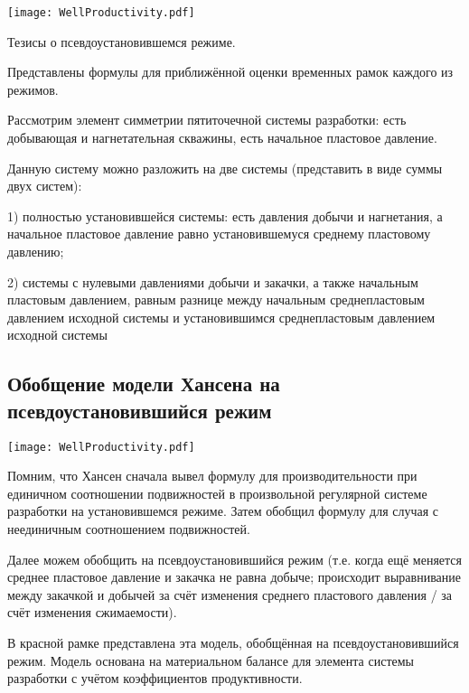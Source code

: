 \documentclass[main.tex]{subfiles}
\begin{document}
\texttt{[image: WellProductivity.pdf]}

Тезисы о псевдоустановившемся режиме.

Представлены формулы для приближённой оценки временных рамок каждого из режимов.


Рассмотрим элемент симметрии пятиточечной системы разработки: есть добывающая и нагнетательная скважины, есть начальное пластовое давление.

Данную систему можно разложить на две системы (представить в виде суммы двух систем):

1) полностью установившейся системы: есть давления добычи и нагнетания, а начальное пластовое давление равно установившемуся среднему пластовому давлению;

2) системы с нулевыми давлениями добычи и закачки, а также начальным пластовым давлением, равным разнице между начальным среднепластовым давлением исходной системы и установившимся среднепластовым давлением исходной системы

\subsection{Обобщение модели Хансена на псевдоустановившийся режим}

\texttt{[image: WellProductivity.pdf]}


Помним, что Хансен сначала вывел формулу для производительности при единичном соотношении подвижностей в произвольной регулярной системе разработки на установившемся режиме. Затем обобщил формулу для случая с неединичным соотношением подвижностей.

Далее можем обобщить на псевдоустановившийся режим (т.е. когда ещё меняется среднее пластовое давление и закачка не равна добыче; происходит выравнивание между закачкой и добычей за счёт изменения среднего пластового давления / за счёт изменения сжимаемости).

В красной рамке представлена эта модель, обобщённая на псевдоустановившийся режим. Модель основана на материальном балансе для элемента системы разработки с учётом коэффициентов продуктивности.

\end{document}
